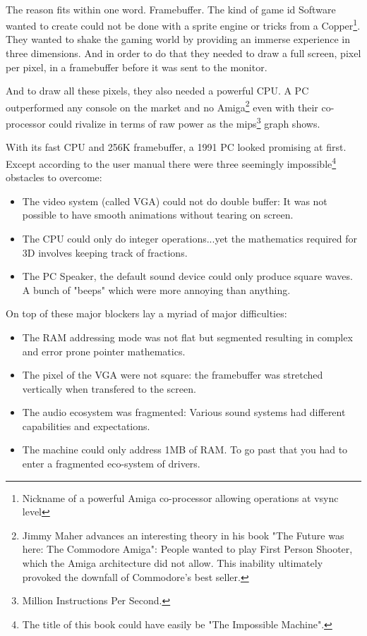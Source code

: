 \\
The reason fits within one word. Framebuffer. The kind of game id Software wanted to create could not be done with a sprite engine or tricks from a Copper\footnote{Nickname of a powerful Amiga co-processor allowing operations at vsync level}. They wanted to shake the gaming world by providing an immerse experience in three dimensions. And in order to do that they needed to draw a full screen, pixel per pixel, in a framebuffer before it was sent to the monitor. \\
\par
And to draw all these pixels, they also needed a powerful CPU. A PC outperformed any console on the market and no Amiga\footnote{Jimmy Maher advances an interesting theory in his book "The Future was here: The Commodore Amiga": People wanted to play First Person Shooter, which the Amiga architecture did not allow. This inability ultimately provoked the downfall of Commodore's best seller.} even with their co-processor could rivalize in terms of raw power as the mips\footnote{Million Instructions Per Second.} graph shows.
\par


 
With its fast CPU and 256K framebuffer, a 1991 PC looked promising at first. Except according to the user manual there were three seemingly impossible\footnote{The title of this book could have easily be "The Impossible Machine".} obstacles to overcome:\\
\begin{itemize}
\item The video system (called VGA) could not do double buffer: It was not possible to have smooth animations without tearing on screen.
\item The CPU could only do integer operations...yet the mathematics required for 3D involves keeping track of fractions.
\item The PC Speaker, the default sound device could only produce square waves. A bunch of "beeps" which were more annoying than anything.
\end{itemize}
On top of these major blockers lay a myriad of major difficulties:\\
\begin{itemize}
\item The RAM addressing mode was not flat but segmented resulting in complex and error prone pointer mathematics.
\item The pixel of the VGA were not square: the framebuffer was stretched vertically when
transfered to the screen.
\item The audio ecosystem was fragmented: Various sound systems had different capabilities and expectations.
\item The machine could only address 1MB of RAM. To go past that you had to enter a fragmented eco-system of drivers.
\end{itemize}

